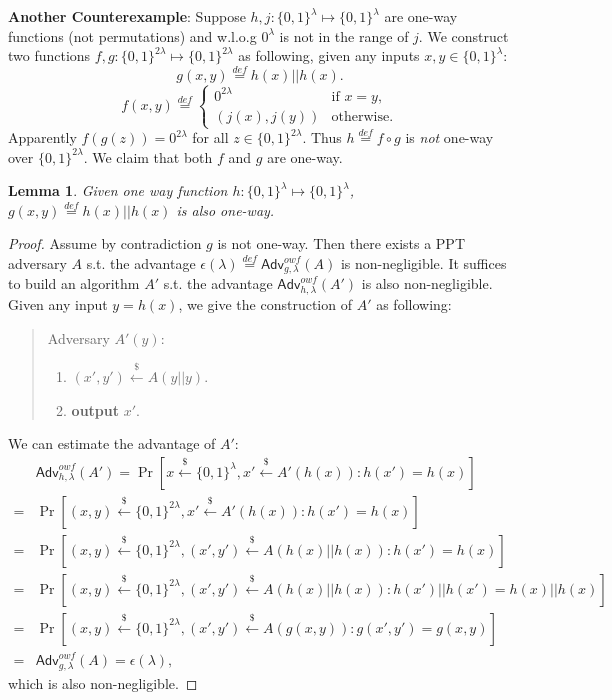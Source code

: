 \documentclass[12pt]{article}
\newcommand{\eqdef}{\stackrel{def}{=}}
\newcommand{\bits}{\{0,1\}}
\newcommand{\getsr}{\stackrel{\$}{\gets}}
\newcommand{\Adv}{\textsf{Adv}}
\newtheorem{lemma}[theorem]{Lemma}
\theoremstyle{definition}
\begin{document}
{\bf Another Counterexample}: Suppose $h, j : \bits^\lambda \mapsto \bits^\lambda$ are one-way functions (not permutations) and w.l.o.g $0^\lambda$ is not in the range of $j$. We construct two functions $f,g : \bits^{2\lambda} \mapsto \bits^{2\lambda}$ as following, given any inputs $x, y \in \bits^\lambda$:
$$g(x,y) \eqdef h(x) || h(x).$$
$$f(x,y) \eqdef
\begin{cases}
0^{2\lambda} & \textrm{if $x=y$,} \\
(j(x),j(y)) & \textrm{otherwise.}
\end{cases}$$
Apparently $f(g(z)) = 0^{2\lambda}$ for all $z\in\bits^{2\lambda}$. Thus $h\eqdef f\circ g$ is \emph{not} one-way over $\bits^{2\lambda}$.
We claim that both $f$ and $g$ are one-way.
\begin{lemma}
Given one way function $h : \bits^\lambda \mapsto \bits^\lambda$, $g(x,y) \eqdef h(x) || h(x)$ is also one-way.
\end{lemma}
\begin{proof}
Assume by contradiction $g$ is not one-way. Then there exists a PPT adversary $A$ s.t. the advantage $\epsilon(\lambda) \eqdef \Adv_{g,\lambda}^{owf}(A)$ is non-negligible. It suffices to build an algorithm $A'$ s.t. the advantage $\Adv_{h,\lambda}^{owf}(A')$ is also non-negligible. Given any input $y=h(x)$, we give the construction of $A'$ as following:
\begin{quote}
Adversary $A' (y)$:
\begin{enumerate}
\item $(x', y') \getsr A(y || y)$.
\item {\bf output} $x'$.
\end{enumerate}
\end{quote}
We can estimate the advantage of $A'$:
$$
\begin{aligned}
&\Adv_{h,\lambda}^{owf}(A') = \Pr[x\getsr \bits^\lambda, x' \getsr A'(h(x)) : h(x')=h(x)] \\
=& \Pr[(x,y)\getsr \bits^{2\lambda}, x' \getsr A'(h(x)) : h(x')=h(x)] \\
=& \Pr[(x,y)\getsr \bits^{2\lambda}, (x', y') \getsr A(h(x) || h(x)) : h(x')=h(x)] \\
=& \Pr[(x,y)\getsr \bits^{2\lambda}, (x', y') \getsr A(h(x) || h(x)) : h(x')||h(x') = h(x)||h(x)] \\
=& \Pr[(x,y)\getsr \bits^{2\lambda}, (x', y') \getsr A(g(x, y)) : g(x', y') = g(x, y)] \\
=& \Adv_{g,\lambda}^{owf}(A) = \epsilon(\lambda),
\end{aligned}
$$
which is also non-negligible.
\end{proof}
\end{document}
